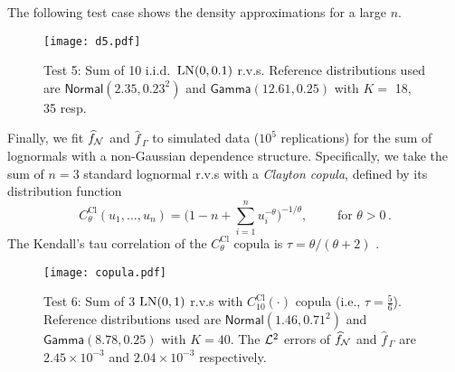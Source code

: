 

The following test case shows the density approximations for a large $n$.


\begin{figure}[H]
\centering
\texttt{[image: d5.pdf]}
\caption*{Test 5: Sum of 10 i.i.d.\ $\mathrm{LN}(0,0.1)$ r.v.s. Reference distributions used are $\mathsf{Normal}(2.35,0.23^2)$ and $\mathsf{Gamma}(12.61,0.25)$ with $K =$ 18, 35 resp.}
\end{figure}


Finally, we fit $\widehat{f}_{\mathcal{N}}$ and $\widehat{f}_{\,\Gamma}$ to simulated data ($10^5$ replications) for the sum of lognormals with a non-Gaussian dependence structure. Specifically, we take the sum of $n = 3$ standard lognormal r.v.s with a \emph{Clayton copula}, defined by its distribution function
\[
C^{\text{Cl}}_\theta(u_1, \dots, u_n) = \Big( 1 - n + \sum_{i=1}^n u_i^{-\theta} \Big)^{-1/\theta}, \qquad \text{ for } \theta > 0 \,.
\]
The Kendall's tau correlation of the $C^{\text{Cl}}_\theta$ copula is $\tau = \theta / (\theta + 2)$ \cite{mcneil2015quantitative}.

\begin{figure}
\centering
\texttt{[image: copula.pdf]}
\caption*{Test 6: Sum of 3 $\mathrm{LN}(0,1)$ r.v.s with $C^{\text{Cl}}_{10}(\cdot)$ copula (i.e., $\tau = \frac56$). Reference distributions used are $\mathsf{Normal}(1.46,0.71^2)$ and $\mathsf{Gamma}(8.78,0.25)$ with $K = 40$. The $\mathcal{L}^2$ errors of $\widehat{f}_{\mathcal{N}}$ and $\widehat{f}_{\,\Gamma}$ are $2.45 \times 10^{-3}$ and $2.04 \times 10^{-3}$ respectively.}
\end{figure}




